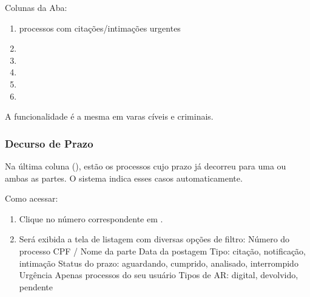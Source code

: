\documentclass[letterpaper,10pt,brazil]{sphinxmanual}
\begin{document}
\sphinxAtStartPar
Colunas da Aba:
\begin{enumerate}
%
\item {} 
\sphinxAtStartPar
{} \textendash{} processos com citações/intimações urgentes

\item {} 
\sphinxAtStartPar
{}

\item {} 
\sphinxAtStartPar
{}

\item {} 
\sphinxAtStartPar
{}

\item {} 
\sphinxAtStartPar
{}

\item {} 
\sphinxAtStartPar
{}

\end{enumerate}

\sphinxAtStartPar
{} A funcionalidade é a mesma em varas cíveis e criminais.


\subsubsection{Decurso de Prazo}
\label{\detokenize{projud_04_analisemultipla:decurso-de-prazo}}
\sphinxAtStartPar
Na última coluna (), estão os processos cujo prazo já decorreu para uma ou ambas as partes. O sistema indica esses casos automaticamente.

\sphinxAtStartPar
Como acessar:
\begin{enumerate}
%
\item {} 
\sphinxAtStartPar
Clique no número correspondente em .

\item {} 
\sphinxAtStartPar
Será exibida a tela de listagem com diversas opções de filtro:
\sphinxhyphen{} Número do processo
\sphinxhyphen{} CPF / Nome da parte
\sphinxhyphen{} Data da postagem
\sphinxhyphen{} Tipo: citação, notificação, intimação
\sphinxhyphen{} Status do prazo: aguardando, cumprido, analisado, interrompido
\sphinxhyphen{} Urgência
\sphinxhyphen{} Apenas processos do seu usuário
\sphinxhyphen{} Tipos de AR: digital, devolvido, pendente

\end{enumerate}
\end{document}
